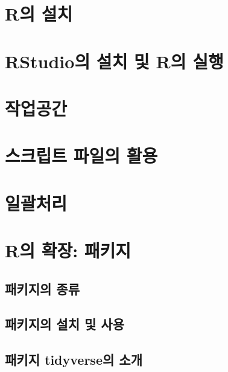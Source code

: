 \documentclass[
]{book}
\begin{document}
\hypertarget{ruxc758-uxc124uxce58}{%
\section{R의 설치}\label{ruxc758-uxc124uxce58}}

\hypertarget{rstudiouxc758-uxc124uxce58-uxbc0f-ruxc758-uxc2e4uxd589}{%
\section{RStudio의 설치 및 R의 실행}\label{rstudiouxc758-uxc124uxce58-uxbc0f-ruxc758-uxc2e4uxd589}}

\hypertarget{uxc791uxc5c5uxacf5uxac04}{%
\section{작업공간}\label{uxc791uxc5c5uxacf5uxac04}}

\hypertarget{uxc2a4uxd06cuxb9bduxd2b8-uxd30cuxc77cuxc758-uxd65cuxc6a9}{%
\section{스크립트 파일의 활용}\label{uxc2a4uxd06cuxb9bduxd2b8-uxd30cuxc77cuxc758-uxd65cuxc6a9}}

\hypertarget{section-batch}{%
\section{일괄처리}\label{section-batch}}

\hypertarget{section-package}{%
\section{R의 확장: 패키지}\label{section-package}}

\hypertarget{uxd328uxd0a4uxc9c0uxc758-uxc885uxb958}{%
\subsection{패키지의 종류}\label{uxd328uxd0a4uxc9c0uxc758-uxc885uxb958}}

\hypertarget{uxd328uxd0a4uxc9c0uxc758-uxc124uxce58-uxbc0f-uxc0acuxc6a9}{%
\subsection{패키지의 설치 및 사용}\label{uxd328uxd0a4uxc9c0uxc758-uxc124uxce58-uxbc0f-uxc0acuxc6a9}}

\hypertarget{uxd328uxd0a4uxc9c0-tidyverseuxc758-uxc18cuxac1c}{%
\subsection{패키지 tidyverse의 소개}\label{uxd328uxd0a4uxc9c0-tidyverseuxc758-uxc18cuxac1c}}
\end{document}
